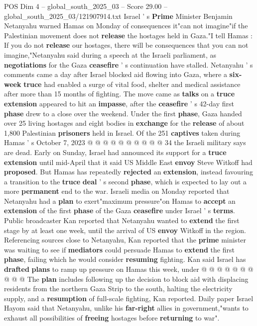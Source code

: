 \begin{textsample}{POS Dim 4 – global\_south\_2025\_03 – Score 29.00 – global\_south\_2025\_03/121907914.txt}  \label{ex:f4_pos_039}
Israel ' s \textbf{Prime} Minister Benjamin Netanyahu warned Hamas on Monday of consequences it"can not imagine"if the Palestinian movement does not \textbf{release} the hostages held in Gaza."I tell Hamas : If you do not \textbf{release} our hostages, there will be consequences that you can not imagine,"Netanyahu said during a speech at the Israeli parliament, as \textbf{negotiations} for the Gaza \textbf{ceasefire} ' s continuation have stalled.
Netanyahu ' s comments came a day after Israel blocked aid flowing into Gaza, where a \textbf{six-week} \textbf{truce} had enabled a surge of vital food, shelter and medical assistance after more than 15 months of fighting.
The move came as \textbf{talks} on a \textbf{truce} \textbf{extension} appeared to hit an \textbf{impasse}, after the \textbf{ceasefire} ' s 42-day first \textbf{phase} drew to a close over the weekend.
Under the first \textbf{phase}, Gaza handed over 25 living hostages and eight bodies in \textbf{exchange} for the \textbf{release} of about 1,800 Palestinian \textbf{prisoners} held in Israel.
Of the 251 \textbf{captives} taken during Hamas ' s October 7, 2023 @ @ @ @ @ @ @ @ @ @ 34 the Israeli military says are dead.
Early on Sunday, Israel had announced its support for a \textbf{truce} \textbf{extension} until mid-April that it said US Middle East \textbf{envoy} Steve Witkoff had \textbf{proposed}.
But Hamas has repeatedly \textbf{rejected} an \textbf{extension}, instead favouring a transition to the \textbf{truce} \textbf{deal} ' s second \textbf{phase}, which is expected to lay out a more \textbf{permanent} end to the war.
Israeli media on Monday reported that Netanyahu had a \textbf{plan} to exert"maximum pressure"on Hamas to \textbf{accept} an \textbf{extension} of the first \textbf{phase} of the Gaza \textbf{ceasefire} under Israel ' s \textbf{terms}.
Public broadcaster Kan reported that Netanyahu wanted to \textbf{extend} the first stage by at least one week, until the arrival of US \textbf{envoy} Witkoff in the region.
Referencing sources close to Netanyahu, Kan reported that the \textbf{prime} minister was waiting to see if \textbf{mediators} could persuade Hamas to \textbf{extend} the first \textbf{phase}, failing which he would consider \textbf{resuming} fighting.
Kan said Israel has \textbf{drafted} \textbf{plans} to ramp up pressure on Hamas this week, under @ @ @ @ @ @ @ @ @ @ The \textbf{plan} includes following up the decision to block aid with displacing residents from the northern Gaza Strip to the south, halting the electricity supply, and a \textbf{resumption} of full-scale fighting, Kan reported.
Daily paper Israel Hayom said that Netanyahu, unlike his \textbf{far-right} allies in government,"wants to exhaust all possibilities of \textbf{freeing} hostages before \textbf{returning} to war".

\end{textsample}
